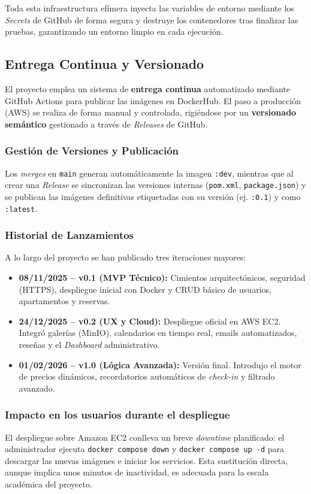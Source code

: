 Toda esta infraestructura efímera inyecta las variables de entorno mediante los \textit{Secrets} de GitHub de forma segura y destruye los contenedores tras finalizar las pruebas, garantizando un entorno limpio en cada ejecución.

\subsection{Entrega Continua y Versionado} 
El proyecto emplea un sistema de \textbf{entrega continua} automatizado mediante GitHub Actions para publicar las imágenes en DockerHub. El paso a producción (AWS) se realiza de forma manual y controlada, rigiéndose por un \textbf{versionado semántico} gestionado a través de \textit{Releases} de GitHub.

\subsubsection{Gestión de Versiones y Publicación}
Los \textit{merges} en \texttt{main} generan automáticamente la imagen \texttt{:dev}, mientras que al crear una \textit{Release} se sincronizan las versiones internas (\texttt{pom.xml}, \texttt{package.json}) y se publican las imágenes definitivas etiquetadas con su versión (ej. \texttt{:0.1}) y como \texttt{:latest}.


\subsubsection{Historial de Lanzamientos}
A lo largo del proyecto se han publicado tres iteraciones mayores:
\begin{itemize}
    \item \textbf{08/11/2025 -- v0.1 (MVP Técnico):} Cimientos arquitectónicos, seguridad (HTTPS), despliegue inicial con Docker y CRUD básico de usuarios, apartamentos y reservas.
    \item \textbf{24/12/2025 -- v0.2 (UX y Cloud):} Despliegue oficial en AWS EC2. Integró galerías (MinIO), calendarios en tiempo real, emails automatizados, reseñas y el \textit{Dashboard} administrativo.
    \item \textbf{01/02/2026 -- v1.0 (Lógica Avanzada):} Versión final. Introdujo el motor de precios dinámicos, recordatorios automáticos de \textit{check-in} y filtrado avanzado.
\end{itemize}

\subsubsection{Impacto en los usuarios durante el despliegue}
El despliegue sobre Amazon EC2 conlleva un breve \textit{downtime} planificado: el administrador ejecuta \texttt{docker compose down} y \texttt{docker compose up -d} para descargar las nuevas imágenes e iniciar los servicios. Esta sustitución directa, aunque implica unos minutos de inactividad, es adecuada para la escala académica del proyecto.